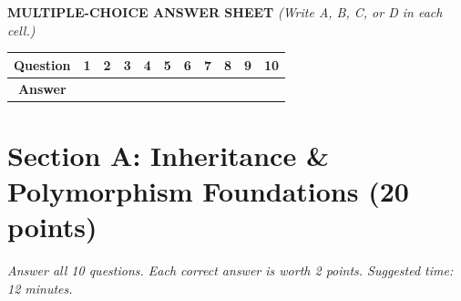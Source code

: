 \documentclass[11pt,a4paper]{article}
\begin{document}
\vspace{1mm}
\textbf{MULTIPLE-CHOICE ANSWER SHEET} \textit{(Write A, B, C, or D in each cell.)}
\begin{center}\setlength{\tabcolsep}{5pt}\renewcommand{\arraystretch}{1.1}
\begin{tabular}{|c|c|c|c|c|c|c|c|c|c|c|}\hline
\textbf{Question} & \textbf{1} & \textbf{2} & \textbf{3} & \textbf{4} & \textbf{5} & \textbf{6} & \textbf{7} & \textbf{8} & \textbf{9} & \textbf{10} \\ \hline
\textbf{Answer} & & & & & & & & & & \\[1.5mm] \hline
\end{tabular}\end{center}
\vspace{-2.5mm}
\section*{Section A: Inheritance \& Polymorphism Foundations \hfill \normalsize\normalfont(20 points)}
\textit{Answer all 10 questions. Each correct answer is worth 2 points. Suggested time: 12 minutes.}
\end{document}
